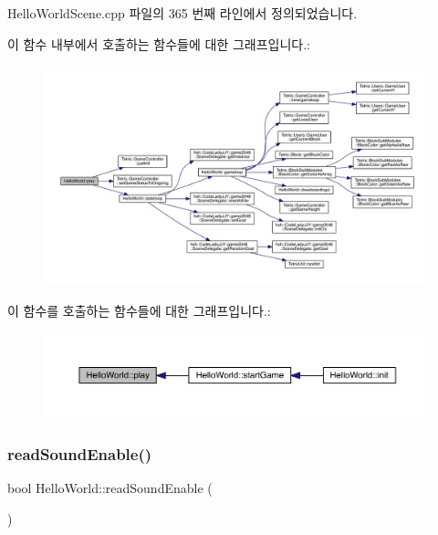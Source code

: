 Hello\+World\+Scene.\+cpp 파일의 365 번째 라인에서 정의되었습니다.

이 함수 내부에서 호출하는 함수들에 대한 그래프입니다.\+:
\nopagebreak
\begin{figure}[H]
\begin{center}
\leavevmode
\includegraphics[width=350pt]{class_hello_world_ac1aee383de0a7c30e84f7efc0da8d944_cgraph}
\end{center}
\end{figure}
이 함수를 호출하는 함수들에 대한 그래프입니다.\+:
\nopagebreak
\begin{figure}[H]
\begin{center}
\leavevmode
\includegraphics[width=350pt]{class_hello_world_ac1aee383de0a7c30e84f7efc0da8d944_icgraph}
\end{center}
\end{figure}
\mbox{\label{class_hello_world_a0f8c9d1b95e03b397e680b9dafb8f3d9}} 
\subsubsection{\texorpdfstring{read\+Sound\+Enable()}{readSoundEnable()}}
{\footnotesize\ttfamily bool Hello\+World\+::read\+Sound\+Enable (\begin{DoxyParamCaption}{ }\end{DoxyParamCaption})\hspace{0.3cm}{\ttfamily [protected]}}

